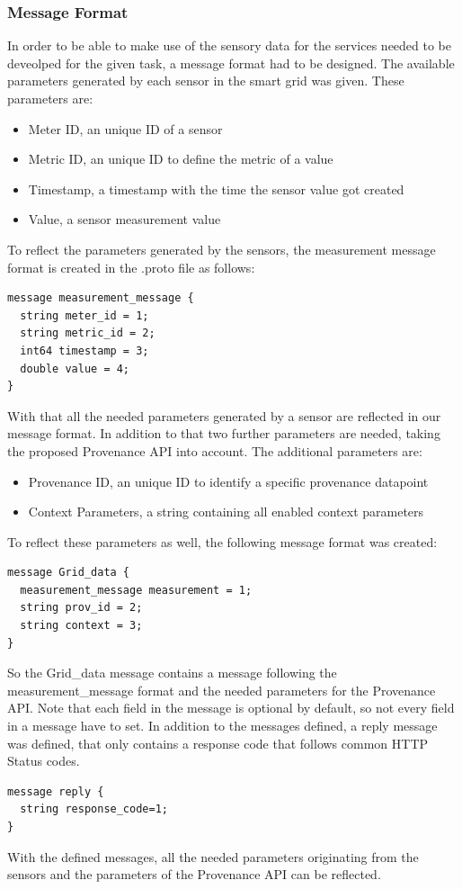 \subsubsection{Message Format}
In order to be able to make use of the sensory data for the services needed to be deveolped for the given task, a message format had to be designed. The available parameters generated by each sensor in the smart grid was given. These parameters are: 
\begin{itemize}
\item Meter ID, an unique ID of a sensor
\item Metric ID, an unique ID to define the metric of a value
\item Timestamp, a timestamp with the time the sensor value got created
\item Value, a sensor measurement value
\end{itemize}
To reflect the parameters generated by the sensors, the measurement message format is created in the .proto file as follows:
\begin{lstlisting}
message measurement_message {
  string meter_id = 1;
  string metric_id = 2;
  int64 timestamp = 3;
  double value = 4;
}
\end{lstlisting}
With that all the needed parameters generated by a sensor are reflected in our message format. In addition to that two further parameters are needed, taking the proposed Provenance API into account. The additional parameters are:
\begin{itemize}
\item Provenance ID, an unique ID to identify a specific provenance datapoint
\item Context Parameters, a string containing all enabled context parameters 
\end{itemize}
To reflect these parameters as well, the following message format was created:
\begin{lstlisting}
message Grid_data {
  measurement_message measurement = 1;
  string prov_id = 2;
  string context = 3;
}
\end{lstlisting}
So the Grid\_data message contains a message following the measurement\_message format and the needed parameters for the Provenance API. Note that each field in the message is optional by default, so not every field in a message have to set.
In addition to the messages defined, a reply message was defined, that only contains a response code that follows common HTTP Status codes.
\begin{lstlisting}
message reply {
  string response_code=1;
}
\end{lstlisting}
With the defined messages, all the needed parameters originating from the sensors and the parameters of the Provenance API can be reflected.

